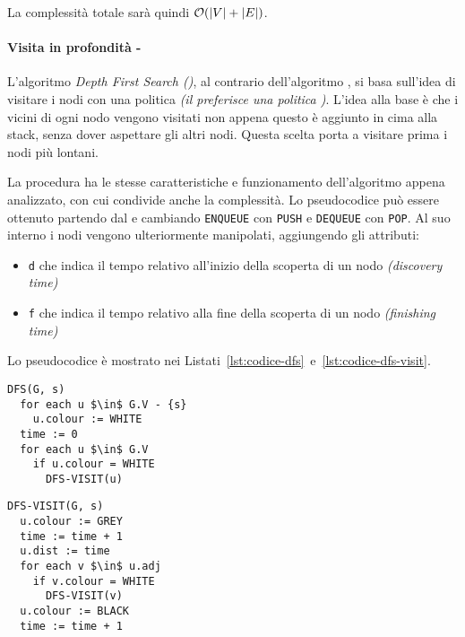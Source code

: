 \documentclass[italian, 10pt]{article}
\begin{document}
La complessità totale sarà quindi \(\mathcal{O}(|V|+|E|)\).

\paragraph{Visita in profondità - \DFS}
\label{par:grafi-dfs}

L'algoritmo \textit{Depth First Search (\DFS)}, al contrario dell'algoritmo \BFS, si basa sull'idea di visitare i nodi con una politica \LIFO \textit{(il \BFS preferisce una politica \FIFO)}.
L'idea alla base è che i vicini di ogni nodo vengono visitati non appena questo è aggiunto in cima alla stack, senza dover aspettare gli altri nodi.
Questa scelta porta a visitare prima i nodi più lontani.

La procedura ha le stesse caratteristiche e funzionamento dell'algoritmo \BFS appena analizzato, con cui condivide anche la complessità.
Lo pseudocodice può essere ottenuto partendo dal \DFS e cambiando \texttt{ENQUEUE} con \texttt{PUSH} e \texttt{DEQUEUE} con \texttt{POP}.
Al suo interno i nodi vengono ulteriormente manipolati, aggiungendo gli attributi:

\begin{itemize}
  \item \texttt{d} che indica il tempo relativo all'inizio della scoperta di un nodo \textit{(discovery time)}
  \item \texttt{f} che indica il tempo relativo alla fine della scoperta di un nodo \textit{(finishing time)}
\end{itemize}

\bigskip
Lo pseudocodice è mostrato nei Listati~\ref{lst:codice-dfs}~e~\ref{lst:codice-dfs-visit}.

\begin{minipage}[t]{.495\textwidth}
  \begin{lstlisting}[style=pseudocode, caption={Algoritmo \texttt{DFS}}, label={lst:codice-dfs}]
DFS(G, s)
  for each u $\in$ G.V - {s}
    u.colour := WHITE
  time := 0
  for each u $\in$ G.V
    if u.colour = WHITE
      DFS-VISIT(u)
\end{lstlisting}
\end{minipage}
\begin{minipage}[t]{.495\textwidth}
  \begin{lstlisting}[style=pseudocode, caption={Funzione di supporto a \texttt{DFS}}, label={lst:codice-dfs-visit}]
DFS-VISIT(G, s)
  u.colour := GREY
  time := time + 1
  u.dist := time
  for each v $\in$ u.adj
    if v.colour = WHITE
      DFS-VISIT(v)
  u.colour := BLACK
  time := time + 1
\end{lstlisting}
\end{minipage}
\end{document}
